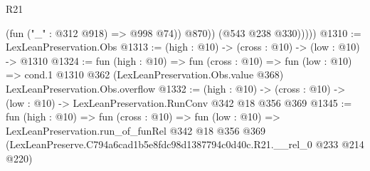 \begin{lexlean}{R21}
\begin{coremodule}
                  (fun ("_" : @312 @918) => @998 @74))
                @870))
            (@543 @238 @330)))))
@1310 := LexLeanPreservation.Obs
@1313 := (high : @10) -> (cross : @10) -> (low : @10) -> @1310
@1324 := fun (high : @10) =>
  fun (cross : @10) =>
  fun (low : @10) =>
  cond.{1} @1310 @362 (LexLeanPreservation.Obs.value @368) LexLeanPreservation.Obs.overflow
@1332 := (high : @10) ->
  (cross : @10) -> (low : @10) -> LexLeanPreservation.RunConv @342 @18 @356 @369
@1345 := fun (high : @10) =>
  fun (cross : @10) =>
  fun (low : @10) =>
  LexLeanPreservation.run_of_funRel
    @342
    @18
    @356
    @369
    (LexLeanPreserve.C794a6cad1b5e8fdc98d1387794c0d40c.R21.__rel_0 @233 @214 @220)
\end{coremodule}
\end{lexlean}
